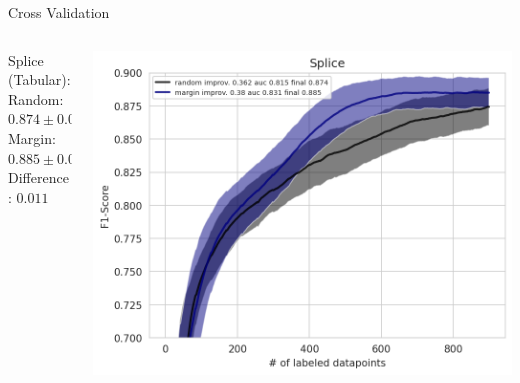 \documentclass[aspectratio=169, 11pt, invertlogo]{ismll-slides}
\begin{document}

\begin{frame}[fragile]{Cross Validation}
	\begin{columns}
		\begin{column}{0.3\linewidth}
			Splice (Tabular): \\
			Random: $0.874 \pm 0.01$ \\
			Margin: $0.885 \pm 0.015$ \\
			Difference: $0.011$
		\end{column}
		\hspace{3mm}
		\begin{column}{0.7\linewidth}
			\includegraphics[width=0.9\linewidth]{pics/splice_performance.png}
		\end{column}
	\end{columns}
\end{frame}

\end{document}
